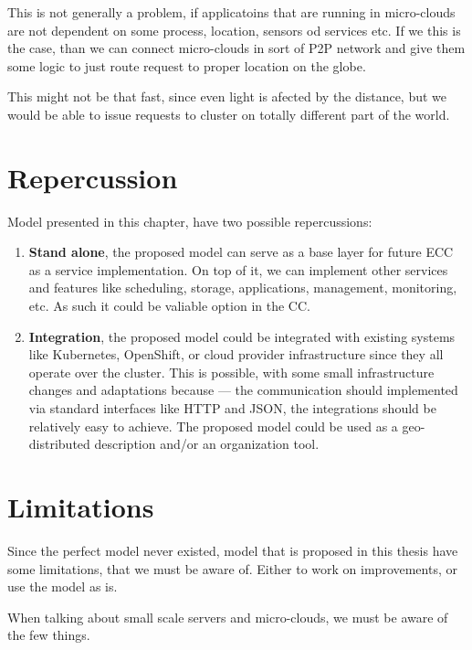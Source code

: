 This is not generally a problem, if applicatoins that are running in micro-clouds are not dependent on some process, location, sensors od services etc. If we this is the case, than we can connect micro-clouds in sort of P2P network and give them some logic to just route request to proper location on the globe. 

This might not be that fast, since even light is afected by the distance, but we would be able to issue requests to cluster on totally different part of the world.
%
%
\section{Repercussion}\label{sec:repercussion}
%
Model presented in this chapter, have two possible repercussions:

\begin{enumerate}[start=1,label={(\bfseries \arabic*)}]
	\item \textbf{Stand alone}, the proposed model can serve as a base layer for future ECC as a service implementation. On top of it, we can implement other services and features like scheduling, storage, applications, management, monitoring, etc. As such it could be valiable option in the CC.
	\item \textbf{Integration}, the proposed model could be integrated with existing systems like Kubernetes, OpenShift, or cloud provider infrastructure since they all operate over the cluster. This is possible, with some small infrastructure changes and adaptations because --- the communication should implemented via standard interfaces like HTTP and JSON, the integrations should be relatively easy to achieve. The proposed model could be used as a geo-distributed description and/or an  organization tool.
\end{enumerate} 
%
%
\section{Limitations}\label{sec:limitations}
%
Since the perfect model never existed, model that is proposed in this thesis have some limitations, that we must be aware of. Either to work on improvements, or use the model as is. 

When talking about small scale servers and micro-clouds, we must be aware of the few things. 

